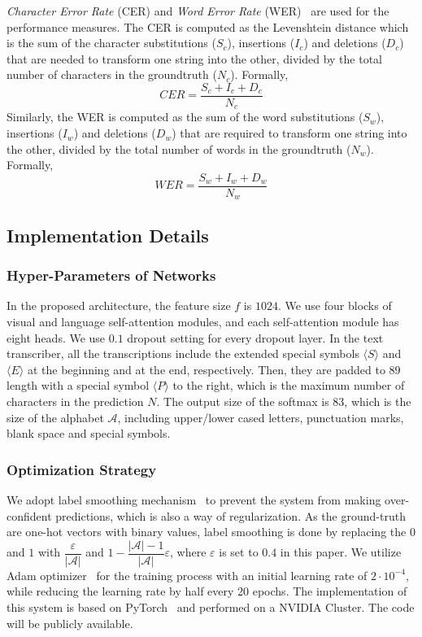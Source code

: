 \documentclass[10pt,twocolumn,letterpaper]{article}
\begin{document}
\emph{Character Error Rate} (CER) and \emph{Word Error Rate} (WER)~\cite{frinken2014continuous} are used for the performance measures. The CER is computed as the Levenshtein distance which is the sum of the character substitutions ($S_c$), insertions ($I_c$) and deletions ($D_c$) that are needed to transform one string into the other, divided by the total number of characters in the groundtruth ($N_c$). Formally, 
    \begin{equation}
	   CER = \frac{S_c + I_c + D_c}{N_c}
	\end{equation}
Similarly, the WER is computed as the sum of the word substitutions ($S_w$), insertions ($I_w$) and deletions ($D_w$) that are required to transform one string into the other, divided by the total number of words in the groundtruth ($N_w$). Formally,
	\begin{equation}
	   WER = \frac{S_w + I_w + D_w}{N_w}
	\end{equation}

\subsection{Implementation Details}




\subsubsection{Hyper-Parameters of Networks}
In the proposed architecture, the feature size $f$ is $1024$. We use four blocks of visual and language self-attention modules, and each self-attention module has eight heads. We use $0.1$ dropout setting for every dropout layer. In the text transcriber, all the transcriptions include the extended special symbols $\langle S\rangle$ and $\langle E\rangle$ at the beginning and at the end, respectively. Then, they are padded to $89$ length with a special symbol $\langle P \rangle$ to the right, which is the maximum number of characters in the prediction $N$. The output size of the softmax is $83$, which is the size of the alphabet $\mathcal{A}$, including upper/lower cased letters, punctuation marks, blank space and special symbols.

\subsubsection{Optimization Strategy}
We adopt label smoothing mechanism~\cite{szegedy2016rethinking} to prevent the system from making over-confident predictions, which is also a way of regularization. As the ground-truth are one-hot vectors with binary values, label smoothing is done by replacing the $0$ and $1$ with $\dfrac{\varepsilon}{|\mathcal{A}|}$ and $1-\dfrac{|\mathcal{A}|-1}{|\mathcal{A}|}\varepsilon$, where $\varepsilon$ is set to $0.4$ in this paper. We utilize Adam optimizer~\cite{kingma2014adam} for the training process with an initial learning rate of $2 \cdot 10^{-4}$, while reducing the learning rate by half every 20 epochs. The implementation of this system is based on PyTorch~\cite{paszke2017automatic} and performed on a NVIDIA Cluster. The code will be publicly available.
\end{document}
